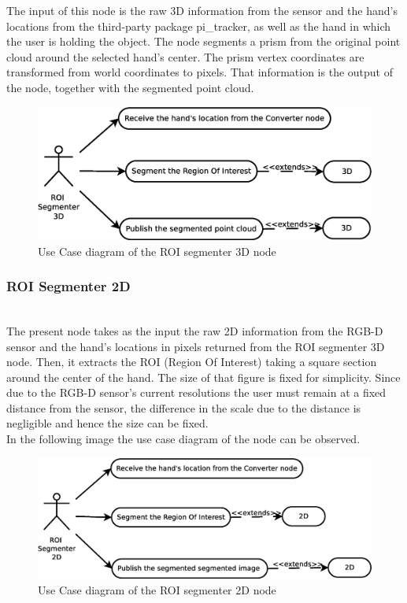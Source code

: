 	The input of this node is the raw 3D information from the sensor and the hand's locations from the third-party package pi\_tracker, as well as the hand in which the user is holding the object. The node segments a prism from the original point cloud around the selected hand's center. The prism vertex coordinates are transformed from world coordinates to pixels. That information is the output of the node, together with the segmented point cloud. 

	\begin{figure}[H]
		\centering
	\includegraphics[scale=0.4]{img/diagrams/uc_roi_segmenter_3d.eps}
		\caption[Use case diagram ROI segmenter 3D node]{Use Case diagram of the ROI segmenter 3D node}
		
	\end{figure}
 
\subsubsection{ROI Segmenter 2D}\\
	\label{roi_segmenter_2d}
	The present node takes as the input the raw 2D information from the RGB-D sensor and the hand's locations in pixels returned from the ROI segmenter 3D node. Then, it extracts the ROI (Region Of Interest) taking a square section around the center of the hand. The size of that figure is fixed for simplicity. Since due to the RGB-D sensor's current resolutions the user must remain at a fixed distance from the sensor, the difference in the scale due to the distance is negligible and hence the size can be fixed. 
	\\

	In the following image the use case diagram of the node can be observed.
	\begin{figure}[H]
		\centering
			\includegraphics[scale=0.4]{img/diagrams/uc_roi_segmenter_2d.eps}
			\caption[Use case diagram ROI segmenter 2D node]{Use Case diagram of the ROI segmenter 2D node}
		
	\end{figure}


